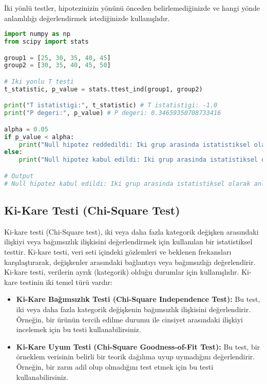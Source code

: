 İki yönlü testler, hipotezinizin yönünü önceden belirlemediğinizde ve hangi yönde anlamlılığı değerlendirmek istediğinizde kullanışlıdır.

\begin{lstlisting}[language=Python]
import numpy as np
from scipy import stats

group1 = [25, 30, 35, 40, 45]
group2 = [30, 35, 40, 45, 50]

# Iki yonlu T testi
t_statistic, p_value = stats.ttest_ind(group1, group2)

print("T istatistigi:", t_statistic) # T istatistigi: -1.0
print("P degeri:", p_value) # P degeri: 0.34659350708733416

alpha = 0.05
if p_value < alpha:
    print("Null hipotez reddedildi: Iki grup arasinda istatistiksel olarak anlamli bir fark vardir.")
else:
    print("Null hipotez kabul edildi: Iki grup arasinda istatistiksel olarak anlamli bir fark yoktur.")

# Output
# Null hipotez kabul edildi: Iki grup arasinda istatistiksel olarak anlamli bir fark yoktur.
\end{lstlisting}

\newpage

\subsection{Ki-Kare Testi (Chi-Square Test)}
Ki-kare testi (Chi-Square test), iki veya daha fazla kategorik değişken arasındaki ilişkiyi veya bağımsızlık ilişkisini değerlendirmek için kullanılan bir istatistiksel testtir. Ki-kare testi, veri seti içindeki gözlemleri ve beklenen frekansları karşılaştırarak, değişkenler arasındaki bağlantıyı veya bağımsızlığı değerlendirir. Ki-kare testi, verilerin ayrık (kategorik) olduğu durumlar için kullanışlıdır. Ki-kare testinin iki temel türü vardır:

\begin{itemize}
    \item \textbf{Ki-Kare Bağımsızlık Testi (Chi-Square Independence Test):} Bu test, iki veya daha fazla kategorik değişkenin bağımsızlık ilişkisini değerlendirir. Örneğin, bir ürünün tercih edilme durumu ile cinsiyet arasındaki ilişkiyi incelemek için bu testi kullanabilirsiniz.
    \item \textbf{Ki-Kare Uyum Testi (Chi-Square Goodness-of-Fit Test):} Bu test, bir örneklem verisinin belirli bir teorik dağılıma uyup uymadığını değerlendirir. Örneğin, bir zarın adil olup olmadığını test etmek için bu testi kullanabilirsiniz.
\end{itemize}

